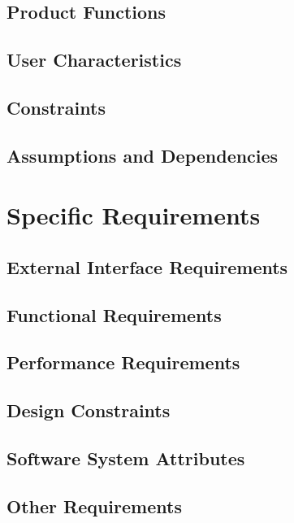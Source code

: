 \documentclass{article}
\begin{document}
	\subsection{Product Functions}
	
	
	\subsection{User Characteristics}
	
	
	\subsection{Constraints}
	
	
	\subsection{Assumptions and Dependencies}
	
	
\section{Specific Requirements}
	\subsection{External Interface Requirements}
	
	
	\subsection{Functional Requirements}
	
	
	\subsection{Performance Requirements}
	
	
	\subsection{Design Constraints}
	
	
	\subsection{Software System Attributes}
	
	
	\subsection{Other Requirements}
	
\end{document}
